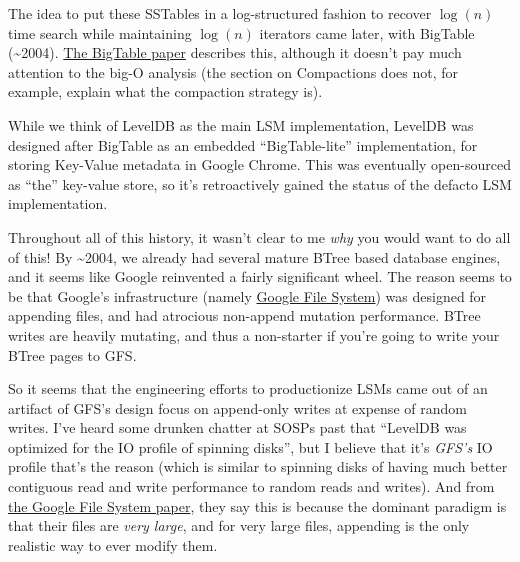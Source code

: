 \documentclass[a4paper,12pt,notitlepage,twoside,openright]{article}
\begin{document}
The idea to put these SSTables in a log-structured fashion to recover
\(\log(n)\) time search while maintaining \(\log(n)\) iterators
came later, with BigTable (\textasciitilde{}2004).
\href{https://static.googleusercontent.com/media/research.google.com/en//archive/bigtable-osdi06.pdf}{The
BigTable paper} describes this, although it doesn't pay much attention
to the big-O analysis (the section on Compactions does not, for example,
explain what the compaction strategy is).

While we think of LevelDB as the main LSM implementation, LevelDB was
designed after BigTable as an embedded ``BigTable-lite'' implementation,
for storing Key-Value metadata in Google Chrome. This was eventually
open-sourced as ``the'' key-value store, so it's retroactively gained
the status of the defacto LSM implementation.

Throughout all of this history, it wasn't clear to me \emph{why} you
would want to do all of this! By \textasciitilde{}2004, we already had
several mature BTree based database engines, and it seems like Google
reinvented a fairly significant wheel. The reason seems to be that
Google's infrastructure (namely
\href{http://static.googleusercontent.com/media/research.google.com/en//archive/gfs-sosp2003.pdf}{Google
File System}) was designed for appending files, and had atrocious
non-append mutation performance. BTree writes are heavily mutating, and
thus a non-starter if you're going to write your BTree pages to GFS.

So it seems that the engineering efforts to productionize LSMs came out
of an artifact of GFS's design focus on append-only writes at expense of
random writes. I've heard some drunken chatter at SOSPs past that
``LevelDB was optimized for the IO profile of spinning disks'', but I
believe that it's \emph{GFS's} IO profile that's the reason (which is
similar to spinning disks of having much better contiguous read and
write performance to random reads and writes). And from
\href{http://static.googleusercontent.com/media/research.google.com/en//archive/gfs-sosp2003.pdf}{the
Google File System paper}, they say this is because the dominant
paradigm is that their files are \emph{very large}, and for very large
files, appending is the only realistic way to ever modify them.
\end{document}
